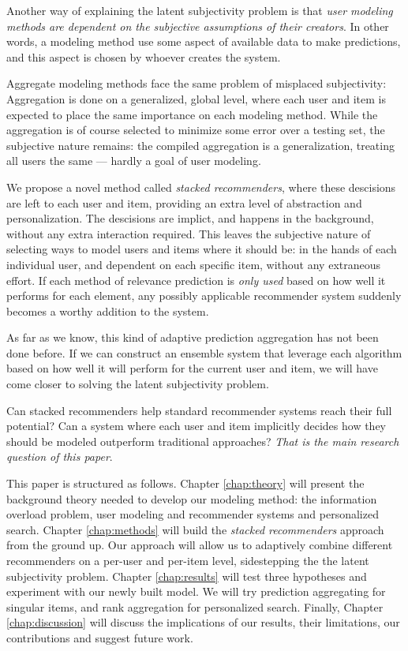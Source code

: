 Another way of explaining the latent subjectivity problem is that 
\emph{user modeling methods are dependent on the subjective assumptions of their creators}.
In other words, a modeling method use some aspect of available data to make predictions,
and this aspect is chosen by whoever creates the system.

Aggregate modeling methods face the same problem of misplaced subjectivity: 
Aggregation is done on a generalized, global level,
where each user and item is expected to place the same importance on each modeling method.
While the aggregation is of course selected to minimize some error over a testing set,
the subjective nature remains: the compiled aggregation is a generalization,
treating all users the same --- hardly a goal of user modeling.

We propose a novel method called \emph{stacked recommenders}, where these descisions are left to each user and item,
providing an extra level of abstraction and personalization.
The descisions are implict, and happens in the background, without any extra interaction required.
This leaves the subjective nature of selecting ways to model users and items where it should be:
in the hands of each individual user, and dependent on each specific item, without any extraneous effort.
If each method of relevance prediction is \emph{only used} based on how well it performs for each element,
any possibly applicable recommender system suddenly becomes a worthy addition to the system.

As far as we know, this kind of adaptive prediction aggregation has not been done before.
If we can construct an ensemble system that leverage each algorithm
based on how well it will perform for the current user and item,
we will have come closer to solving the latent subjectivity problem.

Can stacked recommenders help standard recommender systems reach their full potential?
Can a system where each user and item implicitly decides how they should be modeled outperform traditional approaches?
\emph{That is the main research question of this paper}.


This paper is structured as follows.
Chapter \ref{chap:theory} will present the background theory needed to develop our modeling method:
the information overload problem, user modeling and recommender systems and personalized search. 
Chapter \ref{chap:methods} will build the \emph{stacked recommenders} approach from the ground up.
Our approach will allow us to adaptively combine different recommenders
on a per-user and per-item level, sidestepping the the latent subjectivity problem.
Chapter \ref{chap:results} will test three hypotheses and experiment with our newly built model.
We will try prediction aggregating for singular items, and rank aggregation for personalized search.
Finally, Chapter \ref{chap:discussion} will discuss the implications of our results,
their limitations, our contributions and suggest future work.


